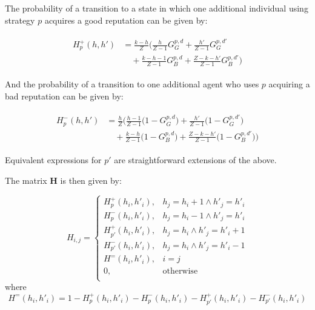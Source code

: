 \documentclass[sigconf]{aamas}  %
\begin{document}
The probability of a transition to a state in which one additional individual using strategy $p$ acquires a good reputation can be given by:

\begin{align*}
\begin{split}
H_{p}^{+}(h,h') & =  \frac{k-h}{Z}\bigg( \frac{h}{Z-1}G^{p,d}_G + 	\frac{h'}{Z-1}G^{p,d'}_G \\  
	& \quad {} + \frac{k-h-1}{Z-1}G^{p,d}_B  + \frac{Z-k-h'}{Z-1}G^{p,d'}_B \bigg)
\end{split}
\end{align*}



And the probability of a transition to one additional agent who uses $p$ acquiring a bad reputation can be given by:

\begin{align*}
\begin{split}
H_{p}^{-}(h,h') & = \frac{h}{Z}
	\bigg(\frac{h-1}{Z-1} \big(1-G^{p,d}_G\big) + \frac{h'}{Z-1}\big(1 - G^{p,d'}_G\big) \\ 
	&\quad {} +\frac{k-h}{Z-1}\big(1-G^{p,d}_B \big) + \frac{Z-k-h'}{Z-1}\big(1-G^{p,d'}_B \big)\bigg)
\end{split}
\end{align*}

Equivalent expressions for $p'$ are straightforward extensions of the above.

The matrix $\mathbf{H}$ is then given by:

\begin{equation*}
	H_{i,j} = \begin{cases}
		H^{+}_{p}(h_i,h'_i), &h_j = h_i + 1 \wedge h'_j = h'_i\\
		H^{-}_{p}(h_i,h'_i), &h_j = h_i - 1 \wedge h'_j = h'_i\\
		H^{+}_{p'}(h_i,h'_i), &h_j = h_i \wedge h'_j = h'_i + 1\\
		H^{-}_{p'}(h_i,h'_i), &h_j = h_i \wedge h'_j = h'_i - 1\\
		H^{=}(h_i,h'_i), &i = j\\
		0, &\textrm{otherwise}\\
	\end{cases}
\end{equation*}
where 
\begin{equation*}
	H^{=}(h_i,h'_i) = 1- H^{+}_{p}(h_i,h'_i) - H^{-}_{p}(h_i,h'_i) - H^{+}_{p'}(h_i,h'_i) - H^{-}_{p'}(h_i,h'_i)
\end{equation*}
\end{document}
